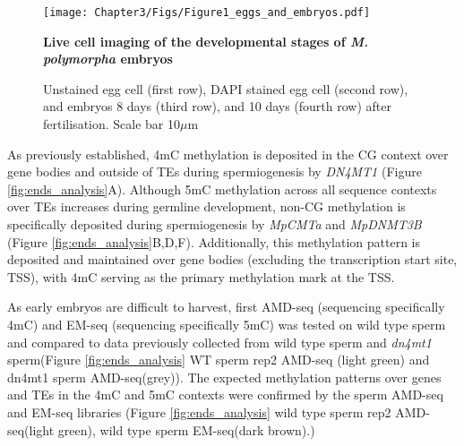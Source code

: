 \begin{figure}[htbp!] 
\centering    
    \texttt{[image: Chapter3/Figs/Figure1\_eggs\_and\_embryos.pdf]}
\caption{\textbf{Live cell imaging of the developmental stages of \textit{M. polymorpha} embryos}}
\label{fig:egg_embryo}
\captionsetup{font=small}
    \caption*{Unstained egg cell (first row), DAPI stained egg cell (second row), and embryos 8 days (third row), and 10 days (fourth row) after fertilisation. Scale bar 10$\mu$m}
\end{figure}

As previously established, 4mC methylation is deposited in the CG context over gene bodies and outside of TEs during spermiogenesis by \textit{DN4MT1} (Figure \ref{fig:ends_analysis}A)\citep{RN189}. Although 5mC methylation across all sequence contexts over TEs increases during germline development, non-CG methylation is specifically deposited during spermiogenesis by \textit{MpCMTa} and \textit{MpDNMT3B} (Figure \ref{fig:ends_analysis}B,D,F)\citep{RN189}.  Additionally, this methylation pattern is deposited and maintained over gene bodies (excluding the transcription start site, TSS), with 4mC serving as the primary methylation mark at the TSS. 

As early embryos are difficult to harvest, first AMD-seq (sequencing specifically 4mC) and EM-seq (sequencing specifically 5mC) was tested on wild type sperm and compared to data previously collected from wild type sperm and \textit{dn4mt1} sperm(Figure \ref{fig:ends_analysis} WT sperm rep2 AMD-seq (light green) and dn4mt1 sperm AMD-seq(grey)). The expected methylation patterns over genes and TEs in the 4mC and 5mC contexts were confirmed by the sperm AMD-seq and EM-seq libraries (Figure \ref{fig:ends_analysis} wild type sperm rep2 AMD-seq(light green), wild type sperm EM-seq(dark brown).) 

